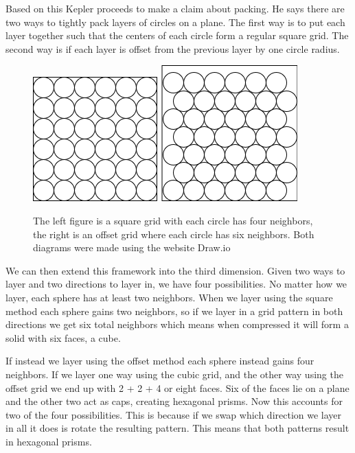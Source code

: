 \documentclass{report}
\begin{document}
Based on this Kepler proceeds to make a claim about packing. He says there are two ways to tightly pack layers of circles on a plane.
The first way is to put each layer together such that the centers of each circle form a regular square grid. The second way is if
each layer is offset from the previous layer by one circle radius. 

\begin{figure}[h]
    \centering
    \includegraphics[scale=0.50]{squaretile}
    \includegraphics[scale=0.50]{offsetgrid}
    \caption{The left figure is a square grid with each circle has four neighbors, the right is an offset grid where each circle has
    six neighbors. Both diagrams were made using the website Draw.io}
\end{figure}

We can then extend this framework into the third dimension. Given two ways to layer and two directions to layer in, we have four 
possibilities. No matter how we layer, each sphere has at least two neighbors. When we layer using the square method each sphere
gains two neighbors, so if we layer in a grid pattern in both directions we get six total neighbors which means when compressed
it will form a solid with six faces, a cube.

If instead we layer using the offset method each sphere instead gains four neighbors. If we layer one way using the cubic grid,
and the other way using the offset grid we end up with 2 + 2 + 4 or eight faces. Six of the faces lie on a plane and the other
two act as caps, creating hexagonal prisms.  Now this accounts for two of the four possibilities. This is because if we swap
which direction we layer in all it does is rotate the resulting pattern. This means that both patterns result in hexagonal prisms.
\end{document}
